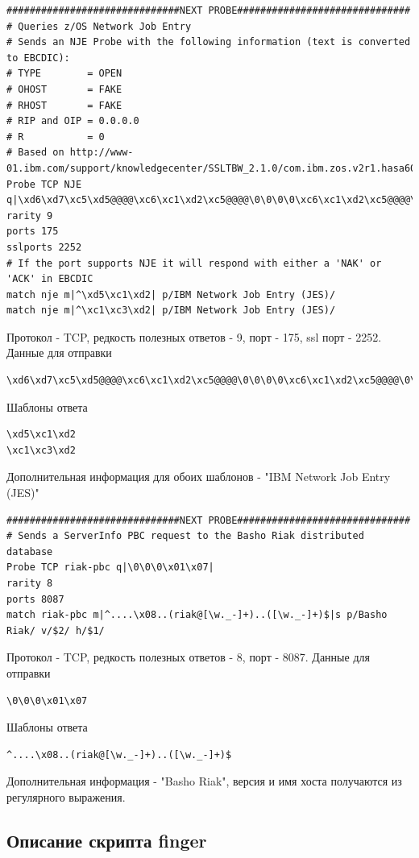 \documentclass[10pt,a4paper]{article}
\begin{document}
\begin{verbatim}
##############################NEXT PROBE##############################
# Queries z/OS Network Job Entry
# Sends an NJE Probe with the following information (text is converted to EBCDIC):
# TYPE        = OPEN
# OHOST       = FAKE
# RHOST       = FAKE
# RIP and OIP = 0.0.0.0
# R           = 0
# Based on http://www-01.ibm.com/support/knowledgecenter/SSLTBW_2.1.0/com.ibm.zos.v2r1.hasa600/init.htm
Probe TCP NJE q|\xd6\xd7\xc5\xd5@@@@\xc6\xc1\xd2\xc5@@@@\0\0\0\0\xc6\xc1\xd2\xc5@@@@\0\0\0\0\0|
rarity 9
ports 175
sslports 2252
# If the port supports NJE it will respond with either a 'NAK' or 'ACK' in EBCDIC
match nje m|^\xd5\xc1\xd2| p/IBM Network Job Entry (JES)/
match nje m|^\xc1\xc3\xd2| p/IBM Network Job Entry (JES)/
\end{verbatim}

Протокол - TCP, редкость полезных ответов - 9, порт - 175, ssl порт - 2252.
Данные для отправки \begin{verbatim}\xd6\xd7\xc5\xd5@@@@\xc6\xc1\xd2\xc5@@@@\0\0\0\0\xc6\xc1\xd2\xc5@@@@\0\0\0\0\0\end{verbatim}
Шаблоны ответа 
\begin{verbatim}
\xd5\xc1\xd2
\xc1\xc3\xd2
\end{verbatim}
Дополнительная информация для обоих шаблонов - "IBM Network Job Entry (JES)"

\begin{verbatim}
##############################NEXT PROBE##############################
# Sends a ServerInfo PBC request to the Basho Riak distributed database
Probe TCP riak-pbc q|\0\0\0\x01\x07|
rarity 8
ports 8087
match riak-pbc m|^....\x08..(riak@[\w._-]+)..([\w._-]+)$|s p/Basho Riak/ v/$2/ h/$1/
\end{verbatim}

Протокол - TCP, редкость полезных ответов - 8, порт - 8087.
Данные для отправки \begin{verbatim}\0\0\0\x01\x07\end{verbatim}
Шаблоны ответа 
\begin{verbatim}
^....\x08..(riak@[\w._-]+)..([\w._-]+)$
\end{verbatim}
Дополнительная информация - "Basho Riak", версия и имя хоста получаются из регулярного выражения.

\subsection{Описание скрипта finger}
\label{finger_script}
\end{document}
